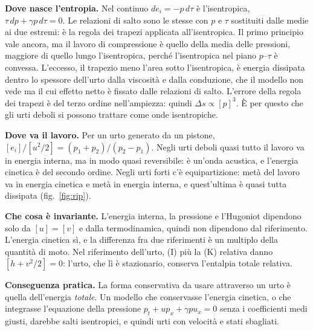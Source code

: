 \documentclass[11pt,a4paper]{article}
\newcommand{\jp}[1]{\left[#1\right]}            %
\begin{document}
\textbf{Dove nasce l'entropia.} Nel continuo $de_i=-p\,d\tau$ è l'isentropica, $\tau\,dp+\gamma p\,d\tau=0$. Le
relazioni di salto sono le stesse con $p$ e $\tau$ sostituiti dalle medie ai due estremi: è la regola dei
trapezi applicata all'isentropica. Il primo principio vale ancora, ma il lavoro di compressione è quello della
media delle pressioni, maggiore di quello lungo l'isentropica, perché l'isentropica nel piano $p$--$\tau$ è convessa.
L'eccesso, il trapezio meno l'area sotto l'isentropica, è energia dissipata dentro lo spessore dell'urto dalla
viscosità e dalla conduzione, che il modello non vede ma il cui effetto netto è fissato dalle relazioni di salto.
L'errore della regola dei trapezi è del terzo ordine nell'ampiezza: quindi $\Delta s\propto\jp{p}^3$. È per questo
che gli urti deboli si possono trattare come onde isentropiche.

\textbf{Dove va il lavoro.} Per un urto generato da un pistone, $\jp{e_i}/\jp{u^2/2}=(p_1+p_2)/(p_2-p_1)$. Negli
urti deboli quasi tutto il lavoro va in energia interna, ma in modo quasi reversibile: è un'onda acustica, e
l'energia cinetica è del secondo ordine. Negli urti forti c'è equipartizione: metà del lavoro va in energia cinetica
e metà in energia interna, e quest'ultima è quasi tutta dissipata (fig.~\ref{fig:rip}).

\textbf{Che cosa è invariante.} L'energia interna, la pressione e l'Hugoniot dipendono solo da $\jp{u}=\jp{v}$ e
dalla termodinamica, quindi non dipendono dal riferimento. L'energia cinetica sì, e la differenza fra due
riferimenti è un multiplo della quantità di moto. Nel riferimento dell'urto, (I) più la (K) relativa danno
$\jp{h+v^2/2}=0$: l'urto, che lì è stazionario, conserva l'entalpia totale relativa.

\textbf{Conseguenza pratica.} La forma conservativa da usare attraverso un urto è quella dell'energia
\emph{totale}. Un modello che conservasse l'energia cinetica, o che integrasse l'equazione della pressione
$p_t+up_x+\gamma pu_x=0$ senza i coefficienti medi giusti, darebbe salti isentropici, e quindi urti con
velocità e stati sbagliati.
\end{document}
